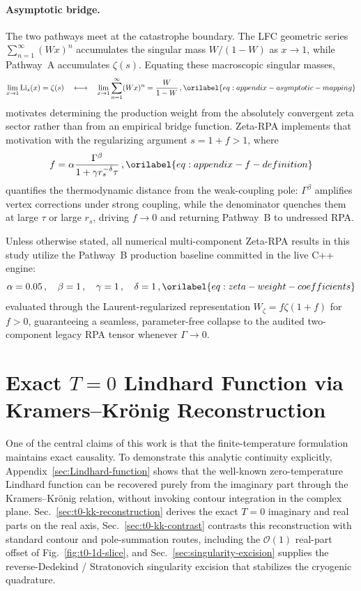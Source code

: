 \documentclass[aps,showkeys,noshowpacs,superscriptaddress,pre,preprint]{revtex4-2}
\let\label\orilabel
\begin{document}
\paragraph{Asymptotic bridge.}
The two pathways meet at the catastrophe boundary. The LFC geometric series $\sum_{n=1}^{\infty}(W x)^n$ accumulates the singular mass $W/(1-W)$ as $x\to 1$, while Pathway~A accumulates $\zeta(s)$. Equating these macroscopic singular masses,
\begin{equation}
\lim_{x \to 1} \mathrm{Li}_s(x) = \zeta(s) \quad \longleftrightarrow \quad \lim_{x \to 1} \sum_{n=1}^{\infty} (W x)^n = \frac{W}{1-W} \,,
\label{eq:appendix-asymptotic-mapping}
\end{equation}
motivates determining the production weight from the absolutely convergent zeta sector rather than from an empirical bridge function.
Zeta-RPA implements that motivation with the regularizing argument $s=1+f>1$, where
\begin{equation}
f = \alpha \frac{\Gamma^\beta}{1 + \gamma r_s^{-\delta} \tau} \,,
\label{eq:appendix-f-definition}
\end{equation}
quantifies the thermodynamic distance from the weak-coupling pole: $\Gamma^\beta$ amplifies vertex corrections under strong coupling, while the denominator quenches them at large $\tau$ or large $r_s$, driving $f\to 0$ and returning Pathway~B to undressed RPA.

Unless otherwise stated, all numerical multi-component Zeta-RPA results in this study utilize the Pathway~B production baseline committed in the live C++ engine:
\begin{equation}
\alpha = 0.05 \,, \quad \beta = 1 \,, \quad \gamma = 1 \,, \quad \delta = 1 \,,
\label{eq:zeta-weight-coefficients}
\end{equation}
evaluated through the Laurent-regularized representation $W_\zeta = f \zeta(1+f)$ for $f > 0$, guaranteeing a seamless, parameter-free collapse to the audited two-component legacy RPA tensor whenever $\Gamma \to 0$.


\section{Exact $T=0$ Lindhard Function via Kramers--Kr\"onig Reconstruction}
\label{sec:Lindhard-function}

One of the central claims of this work is that the finite-temperature formulation maintains exact causality. To demonstrate this analytic continuity explicitly, Appendix~\ref{sec:Lindhard-function} shows that the well-known zero-temperature Lindhard function can be recovered purely from the imaginary part through the Kramers--Kr\"onig relation, without invoking contour integration in the complex plane. Sec.~\ref{sec:t0-kk-reconstruction} derives the exact $T=0$ imaginary and real parts on the real axis, Sec.~\ref{sec:t0-kk-contrast} contrasts this reconstruction with standard contour and pole-summation routes, including the $\mathcal{O}(1)$ real-part offset of Fig.~\ref{fig:t0-1d-slice}, and Sec.~\ref{sec:singularity-excision} supplies the reverse-Dedekind / Stratonovich singularity excision that stabilizes the cryogenic quadrature.
\end{document}
